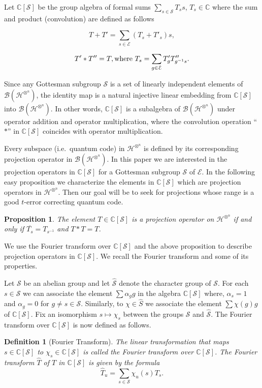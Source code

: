 \documentclass{Rinton-P9x6}
\newtheorem{proposition}[theorem]{Proposition}
\newtheorem{definition}[theorem]{Definition}
\newcommand{\B}{{\ensuremath{\mathcal{B}}}}
\renewcommand{\S}{{\ensuremath{\mathcal{S}}}}
\newcommand{\Hin}{{\ensuremath{\mathcal{H}^{\otimes^n}}}}
\newcommand{\E}{{\ensuremath{\mathcal{E}}}}
\begin{document}
Let $\mathbb{C}[\S]$ be the group algebra of formal sums $\sum_{s \in
  \S} T_s s$, $T_s \in \mathbb{C}$ where the sum and product
(convolution) are defined as follows

\[
T+T'=\sum_{s \in \E} (T_s+T'_s) s,
\]

\[
T'*T''=T,\mbox{\rm where }T_s=\sum_{g\in\E} T'_g T''_{g^{-1}s}.
\]

Since any Gottesman subgroup $\S$ is a set of linearly independent
elements of $\B(\Hin)$, the identity map is a natural injective linear
embedding from $\mathbb{C}[\S]$ into $\B(\Hin)$. In other words,
$\mathbb{C}[\S]$ is a subalgebra of $\B(\Hin)$ under operator addition
and operator multiplication, where the convolution operation ``$*$''
in $\mathbb{C}[\S]$ coincides with operator multiplication.

Every subspace (i.e.\ quantum code) in $\Hin$ is defined by its
corresponding projection operator in $\B(\Hin)$. In this paper we are
interested in the projection operators in $\mathbb{C}[\S]$ for a
Gottesman subgroup $\S$ of $\E$. In the following easy proposition we
characterize the elements in $\mathbb{C}[\S]$ which are projection
operators in $\Hin$. Then our goal will be to seek for projections
whose range is a good $t$-error correcting quantum code.

\begin{proposition}
  The element $T\in\mathbb{C}[\S]$ is a projection operator on $\Hin$ if and
  only if $\overline{T_s}=T_{s^{-1}}$ and $T*T=T$.
\end{proposition}

We use the Fourier transform over $\mathbb{C}[\S]$ and the above proposition to
describe projection operators in $\mathbb{C}[\S]$. We recall the Fourier
transform and some of its properties.

Let $\S$ be an abelian group and let $\hat{\S}$ denote the character
group of $\S$. For each $s\in \S$ we can associate the element
$\sum\alpha_g g$ in the algebra $\mathbb{C}[\S]$ where, $\alpha_s = 1$ and
$\alpha_g=0$ for $g\neq s\in\S$. Similarly, to $\chi\in\hat{S}$ we
associate the element $\sum\chi(g)g$ of $\mathbb{C}[\S]$. Fix an isomorphism
$s \mapsto \chi_s$ between the groups $\S$ and $\hat{\S}$. The Fourier
transform over $\mathbb{C}[\S]$ is now defined as follows.

\begin{definition}[Fourier Transform]
  The linear transformation that maps $s \in \mathbb{C}[\S]$ to $\chi_s \in
  \mathbb{C}[\S]$ is called the \emph{Fourier transform} over $\mathbb{C}[\S]$. The
  Fourier transform $\hat{T}$ of $T$ in $\mathbb{C}[\S]$ is given by the
  formula
  \[ \hat{T}_u = \sum_{s \in \S} \chi_u(s) T_s.\]
\end{definition}
\end{document}
